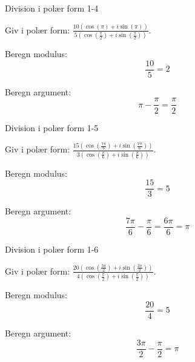 \documentclass{article}
\begin{document}
\newpage

\begin{exercise}{Division i polær form 1-4}

Giv i polær form: $\frac{10(\cos(\pi) + i\sin(\pi))}{5(\cos(\frac{\pi}{2}) + i\sin(\frac{\pi}{2}))}$.


\hint

Beregn modulus:
\[
\frac{10}{5} = 2
\]

\hint

Beregn argument:
\[
\pi - \frac{\pi}{2} = \frac{\pi}{2}
\]

\end{exercise}

\newpage

\begin{exercise}{Division i polær form 1-5}

Giv i polær form: $\frac{15(\cos(\frac{7\pi}{6}) + i\sin(\frac{7\pi}{6}))}{3(\cos(\frac{\pi}{6}) + i\sin(\frac{\pi}{6}))}$.


\hint

Beregn modulus:
\[
\frac{15}{3} = 5
\]

\hint

Beregn argument:
\[
\frac{7\pi}{6} - \frac{\pi}{6} = \frac{6\pi}{6} = \pi
\]

\end{exercise}

\newpage

\begin{exercise}{Division i polær form 1-6}

Giv i polær form: $\frac{20(\cos(\frac{3\pi}{2}) + i\sin(\frac{3\pi}{2}))}{4(\cos(\frac{\pi}{2}) + i\sin(\frac{\pi}{2}))}$.


\hint

Beregn modulus:
\[
\frac{20}{4} = 5
\]

\hint

Beregn argument:
\[
\frac{3\pi}{2} - \frac{\pi}{2} = \pi
\]

\end{exercise}
\end{document}
